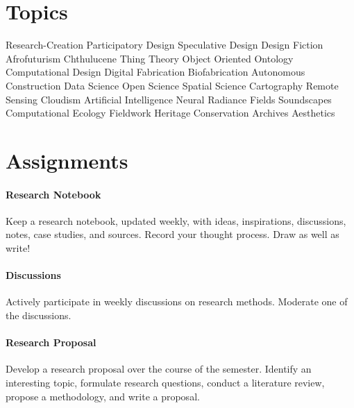 \documentclass[11pt,article,oneside]{memoir}
\begin{document}
\section{Topics}
Research-Creation
\textbullet \space
Participatory Design
\textbullet \space
Speculative Design
\textbullet \space 
Design Fiction
\textbullet \space
Afrofuturism
\textbullet \space
Chthulucene
\textbullet \space
Thing Theory
\textbullet \space
Object Oriented Ontology
\textbullet \space
Computational Design
\textbullet \space
Digital Fabrication
\textbullet \space
Biofabrication
\textbullet \space
Autonomous Construction
\textbullet \space
Data Science
\textbullet \space
Open Science
\textbullet \space
Spatial Science
\textbullet \space
Cartography
\textbullet \space
Remote Sensing
\textbullet \space
Cloudism
\textbullet \space
Artificial Intelligence
\textbullet \space
Neural Radiance Fields
\textbullet \space
Soundscapes
\textbullet \space
Computational Ecology
\textbullet \space
Fieldwork
\textbullet \space
Heritage Conservation
\textbullet \space
Archives
\textbullet \space
Aesthetics

\section{Assignments}

\paragraph{Research Notebook}
Keep a research notebook, updated weekly,
with ideas,
inspirations,
discussions,
notes,
case studies,
and sources.
Record your thought process. 
Draw as well as write!

\paragraph{Discussions}
Actively participate in weekly discussions
on research methods. 
Moderate one of the discussions.

\paragraph{Research Proposal}
Develop a research proposal over the course of the semester.
Identify an interesting topic,
formulate research questions,
conduct a literature review,
propose a methodology,
and write a proposal. 
\end{document}
